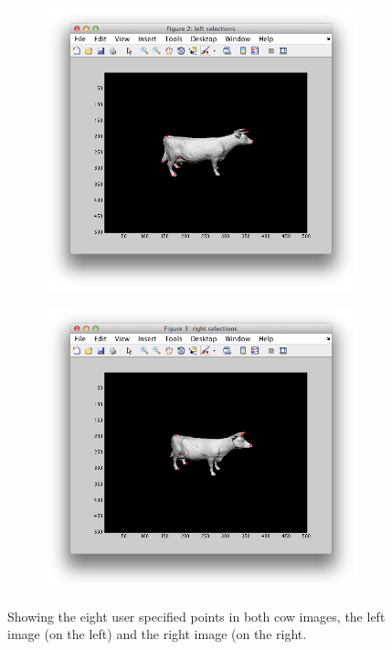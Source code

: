 \documentclass{paper}
\begin{document}
\begin{figure}[H]
\centering
\begin{subfigure}{0.49\textwidth}
\includegraphics[width=\textwidth]{figures/cow_left_selected_points}
\end{subfigure}
\begin{subfigure}{0.49\textwidth}
\includegraphics[width=\textwidth]{figures/cow_right_selected_points}
\end{subfigure}
\caption{Showing the eight user specified points in both cow images, the left image (on the left) and the right image (on the right.}
\label{fig:cow_userselection}
\end{figure}
\end{document}
